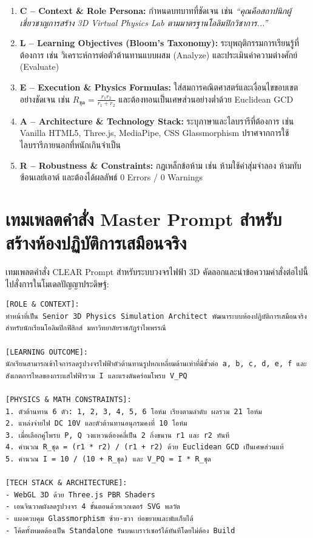 \begin{enumerate}[leftmargin=1.5em, itemsep=4pt]
    \item \textbf{C -- Context \& Role Persona:} กำหนดบทบาทที่ชัดเจน เช่น \textit{“คุณคือสถาปนิกผู้เชี่ยวชาญการสร้าง 3D Virtual Physics Lab ตามมาตรฐานโอลิมปิกวิชาการ...”}
    \item \textbf{L -- Learning Objectives (Bloom's Taxonomy):} ระบุพฤติกรรมการเรียนรู้ที่ต้องการ เช่น วิเคราะห์การต่อตัวต้านทานแบบผสม (Analyze) และประเมินค่าความต่างศักย์ (Evaluate)
    \item \textbf{E -- Execution \& Physics Formulas:} ใส่สมการคณิตศาสตร์และเงื่อนไขขอบเขตอย่างชัดเจน เช่น $R_{\text{ชุด}} = \frac{r_1 r_2}{r_1 + r_2}$ และต้องทอนเป็นเศษส่วนอย่างต่ำด้วย Euclidean GCD
    \item \textbf{A -- Architecture \& Technology Stack:} ระบุภาษาและไลบรารีที่ต้องการ เช่น Vanilla HTML5, Three.js, MediaPipe, CSS Glassmorphism ปราศจากการใช้ไลบรารีภายนอกที่หนักเกินจำเป็น
    \item \textbf{R -- Robustness \& Constraints:} กฎเหล็กข้อห้าม เช่น ห้ามใช้ค่าสุ่มจำลอง ห้ามทับซ้อนเลย์เอาต์ และต้องได้ผลลัพธ์ 0 Errors / 0 Warnings
\end{enumerate}

\section{เทมเพลตคำสั่ง Master Prompt สำหรับสร้างห้องปฏิบัติการเสมือนจริง}

\begin{aiprompt}{เทมเพลตคำสั่ง CLEAR Prompt สำหรับระบบวงจรไฟฟ้า 3D}
คัดลอกและนำข้อความคำสั่งต่อไปนี้ไปสั่งการในโมเดลปัญญาประดิษฐ์:
\begin{lstlisting}
[ROLE & CONTEXT]:
ทำหน้าที่เป็น Senior 3D Physics Simulation Architect พัฒนาระบบห้องปฏิบัติการเสมือนจริงสำหรับนักเรียนโอลิมปิกฟิสิกส์ มหาวิทยาลัยราชภัฏรำไพพรรณี

[LEARNING OUTCOME]:
นักเรียนสามารถเข้าใจการลดรูปวงจรไฟฟ้าตัวต้านทานรูปหกเหลี่ยมด้านเท่าที่มีขั้วต่อ a, b, c, d, e, f และสังเกตการไหลของกระแสไฟฟ้ารวม I และแรงดันคร่อมโพรบ V_PQ

[PHYSICS & MATH CONSTRAINTS]:
1. ตัวต้านทาน 6 ตัว: 1, 2, 3, 4, 5, 6 โอห์ม เรียงตามลำดับ ผลรวม 21 โอห์ม
2. แหล่งจ่ายไฟ DC 10V และตัวต้านทานอนุกรมคงที่ 10 โอห์ม
3. เมื่อเลือกคู่โพรบ P, Q วงแหวนต้องคลี่เป็น 2 กิ่งขนาน r1 และ r2 ทันที
4. คำนวณ R_ชุด = (r1 * r2) / (r1 + r2) ด้วย Euclidean GCD เป็นเศษส่วนแท้
5. คำนวณ I = 10 / (10 + R_ชุด) และ V_PQ = I * R_ชุด

[TECH STACK & ARCHITECTURE]:
- WebGL 3D ด้วย Three.js PBR Shaders
- เอนจินวาดผังลดรูปวงจร 4 ขั้นตอนด้วยเวกเตอร์ SVG พลวัต
- แผงควบคุม Glassmorphism ซ้าย-ขวา ย่อขยายและพับเก็บได้
- โค้ดทั้งหมดต้องเป็น Standalone รันบนเบราว์เซอร์ได้ทันทีโดยไม่ต้อง Build
\end{lstlisting}
\end{aiprompt}

